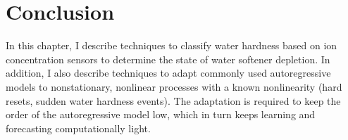 \section{Conclusion}


In this chapter, I describe techniques to classify water hardness based on ion concentration sensors to determine the state of water softener depletion.
 In addition, I also describe techniques to adapt commonly used autoregressive models to nonstationary, nonlinear processes with a known nonlinearity (hard resets, sudden water hardness events).
 The adaptation is required to keep the order of the autoregressive model low, which in turn keeps learning and forecasting computationally light.
